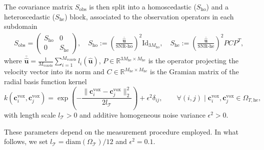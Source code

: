 The covariance matrix $S_{\text{obs}}$ is then split into a homoscedastic ($S_{\text{ho}}$) and a heteroscedastic ($S_{\text{he}}$) block, 
associated to the observation operators in each subdomain
\begin{align*}
  S_{\text{obs}} = \begin{pmatrix}
    S_{\text{ho}} & 0\\
    0 & S_{\text{he}}
    \end{pmatrix},\quad
  S_{\text{ho}} := \left(\frac{\bar{\widehat{\mathbf{u}}}}{\text{SNR-ho}}\right)^2\text{Id}_{3M_{\text{ho}}},\quad
  S_{\text{he}} :=\left(\frac{\bar{\widehat{\mathbf{u}}}}{\text{SNR-he}}\right)^2PCP^T,\;
\end{align*}
where $\bar{\widehat{\mathbf{u}}}=\frac{1}{M_{\text{voxels}}}\sum_{i=1}^{M_{\text{voxels}}}l_i(\widehat{\mathbf{u}})$, $P\in\mathbb{R}^{3M_{\text{he}}\times M_{\text{he}}}$ is the operator 
projecting the velocity vector into its norm and $C\in\mathbb{R}^{M_{\text{he}}\times M_{\text{he}}}$ is the Gramian matrix of the radial basis function kernel
\begin{equation*}
  k(\mathbf{c}^{\text{vox}}_i, \mathbf{c}^{\text{vox}}_j) = \exp\left(-\frac{\lVert\mathbf{c}^{\text{vox}}_i-\mathbf{c}^{\text{vox}}_j\rVert^2_2}{2l_{\mathcal T}}\right)+\epsilon^2\delta_{ij},\qquad
  \forall (i,j) \mid \mathbf{c}^{\text{vox}}_i, \mathbf{c}^{\text{vox}}_j \in \Omega_{T, \text{he}},
\end{equation*}
with length scale $l_{\mathcal T}>0$ and additive homogeneous noise variance $\epsilon^2>0$. 

These parameters depend on the measurement procedure employed. In what follows, we set 
$l_{\mathcal T}=\text{diam}(\Omega_{\mathcal T})/12$ and $\epsilon^2=0.1$.


